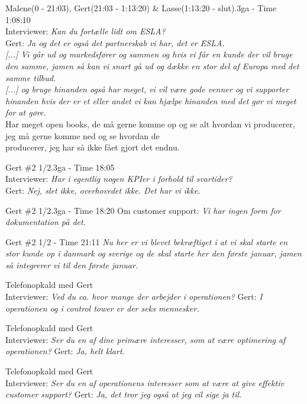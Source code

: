 \begin{thebibliography}{9}
	Malene(0 - 21:03), Gert(21:03 - 1:13:20) \& Lasse(1:13:20 - slut).3ga - Time 1:08:10\\
	Interviewer: \textit{Kan du fortælle lidt om ESLA?}\\
	Gert: \textit{Ja og det er også det partnerskab vi har, det er ESLA.}\\
	\textit{[...] Vi går ud og markedsfører og sammen og hvis vi får en kunde der vil bruge den samme, jamen så kan vi snart gå ud og dække en stor del af Europa med det samme tilbud.}\\
	\textit{[...] og bruge hinanden også har meget, vi vil være gode venner og vi supporter hinanden hvis der er et eller andet vi kan hjælpe hinanden med det gør vi meget for at gøre.}\\
	Har meget open books, de må gerne komme op og se alt hvordan vi producerer,\\
	jeg må gerne komme ned og se hvordan de\\
	producerer, jeg har så ikke fået gjort det endnu.

	Gert \#2 1/2.3ga - Time 18:05\\
	Interviewer: \textit{Har i egentlig nogen KPIer i forhold til svartider?}\\
	Gert: \textit{Nej, slet ikke, overhovedet ikke. Det har vi ikke.}

	Gert \#2 1/2.3ga - Time 18:20
	Om customer support: 
	\textit{Vi har ingen form for dokumentation på det.}

	Gert \#2 1/2 - Time 21:11
	\textit{Nu her er vi blevet bekræftiget i at vi skal starte en stor kunde op i danmark og sverige og de skal starte her den første januar, jamen så integrerer vi til den første januar.}

	Telefonopkald med Gert\\
	Interviewer: \textit{Ved du ca. hvor mange der arbejder i operationen?}
	 Gert: \textit{I operationen og i control tower er der seks mennesker.}

Telefonopkald med Gert\\
	Interviewer: \textit{Ser du en af dine primære interesser, som at være optimering af operationen?} Gert: \textit{Ja, helt klart.}

	Telefonopkald med Gert\\
	Interviewer: \textit{Ser du en af operationens interesser som at være at give effektiv customer support?} Gert: \textit{Ja, det tror jeg også at jeg vil sige ja til.}


\end{thebibliography}
